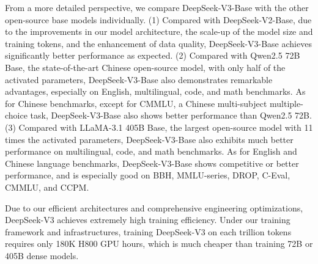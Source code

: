 \documentclass[11pt,a4paper]{article}
\begin{document}
From a more detailed perspective, we compare DeepSeek-V3-Base with the other open-source base models individually. (1) Compared with DeepSeek-V2-Base, due to the improvements in our model architecture, the scale-up of the model size and training tokens, and the enhancement of data quality, DeepSeek-V3-Base achieves significantly better performance as expected. (2) Compared with Qwen2.5 72B Base, the state-of-the-art Chinese open-source model, with only half of the activated parameters, DeepSeek-V3-Base also demonstrates remarkable advantages, especially on English, multilingual, code, and math benchmarks. As for Chinese benchmarks, except for CMMLU, a Chinese multi-subject multiple-choice task, DeepSeek-V3-Base also shows better performance than Qwen2.5 72B. (3) Compared with LLaMA-3.1 405B Base, the largest open-source model with 11 times the activated parameters, DeepSeek-V3-Base also exhibits much better performance on multilingual, code, and math benchmarks. As for English and Chinese language benchmarks, DeepSeek-V3-Base shows competitive or better performance, and is especially good on BBH, MMLU-series, DROP, C-Eval, CMMLU, and CCPM.

Due to our efficient architectures and comprehensive engineering optimizations, DeepSeek-V3 achieves extremely high training efficiency. Under our training framework and infrastructures, training DeepSeek-V3 on each trillion tokens requires only 180K H800 GPU hours, which is much cheaper than training 72B or 405B dense models.
\end{document}
